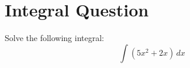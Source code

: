 \documentclass{article}
\begin{document}
\section*{Integral Question}
Solve the following integral:
\[ \int (5x^2 + 2x) \,dx \]
\end{document}
